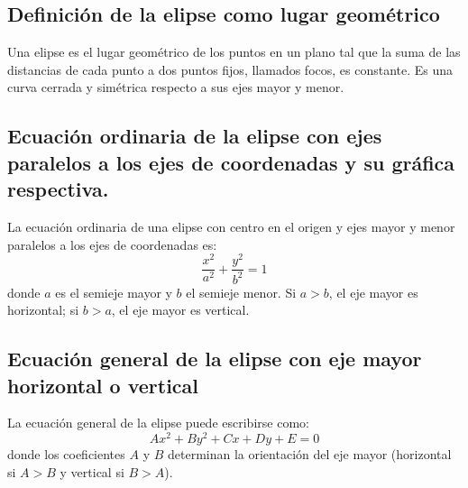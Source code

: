\subsection{Definición de la elipse como lugar geométrico}
Una elipse es el lugar geométrico de los puntos en un plano tal que la suma de las distancias de cada punto a dos puntos fijos, llamados focos, es constante. Es una curva cerrada y simétrica respecto a sus ejes mayor y menor.

\subsection{Ecuación ordinaria de la elipse con ejes paralelos a los ejes de coordenadas y su gráfica respectiva.}
La ecuación ordinaria de una elipse con centro en el origen y ejes mayor y menor paralelos a los ejes de coordenadas es:
\[
\frac{x^2}{a^2} + \frac{y^2}{b^2} = 1
\]
donde \(a\) es el semieje mayor y \(b\) el semieje menor. Si \(a > b\), el eje mayor es horizontal; si \(b > a\), el eje mayor es vertical.

\begin{center}
\end{center}

\subsection{Ecuación general de la elipse con eje mayor horizontal o vertical}
La ecuación general de la elipse puede escribirse como:
\[
Ax^2 + By^2 + Cx + Dy + E = 0
\]
donde los coeficientes \(A\) y \(B\) determinan la orientación del eje mayor (horizontal si \(A > B\) y vertical si \(B > A\)).

